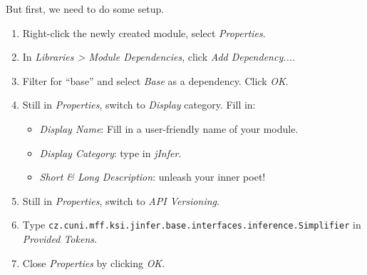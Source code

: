 \documentclass[a4paper,10pt,oneside]{article}
\begin{document}
\par 
\noindent But first, we need to do some setup.
\begin{enumerate}
  \item Right-click the newly created module, select \textit{Properties}.
  \item In \textit{Libraries > Module Dependencies}, click \textit{Add Dependency...}.
  \item Filter for ``base'' and select \textit{Base} as a dependency. Click \textit{OK}.
  \item 
      Still in \textit{Properties}, switch to \textit{Display} category. Fill in:
      \begin{itemize}
        \item \textit{Display Name}: Fill in a user-friendly name of your module.
        \item \textit{Display Category}: type in \textit{jInfer}.
        \item \textit{Short \& Long Description}: unleash your inner poet!
      \end{itemize}
  
  \item Still in \textit{Properties}, switch to \textit{API Versioning}.
  \item Type \texttt{cz.cuni.mff.ksi.jinfer.base.interfaces.inference.Simplifier} in \textit{Provided Tokens}.
  \item Close \textit{Properties} by clicking \textit{OK}.
\end{enumerate}
\end{document}

